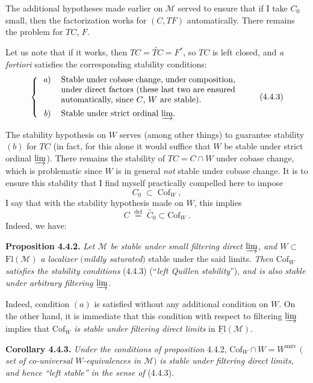 \documentclass[11pt]{article}
\newcommand{\printedpage}[1]{\marginpar{\footnotesize p.~#1}}
\newcommand{\msp}[1]{\marginpar{\footnotesize [#1]}}
\newcommand{\Fl}{\mathrm{Fl}}
\newcommand{\Cof}{\mathrm{Cof}}
\newcommand{\deq}{\overset{\text{def}}{=}}
\newcommand{\univ}{\mathrm{univ}}
\begin{document}
\msp{page 39}
The additional hypotheses made earlier on $\mathcal{M}$ served to ensure that if I take $C_0$ small, then the factorization works for $(C,TF)$ automatically. There remains the problem for $TC$, $F$.

Let us note that if it works, then $TC=\widetilde{TC}=F^*$, so $TC$ is left closed, and \textit{a fortiori} satisfies the corresponding stability conditions:
\[
\left\{
\begin{tabular}{rp{0.6\textwidth}}
\textit{a}) & Stable under cobase change, under composition, under direct factors (these last two are ensured automatically, since $C$, $W$ are stable).\\[1ex]
\textit{b}) & Stable under strict ordinal $\varinjlim$.
\end{tabular}
\right.
\tag*{(4.4.3)}
\]

The stability hypothesis on $W$ serves (among other things) to guarantee stability $(b)$ for $TC$ (in fact, for this alone it would suffice that $W$ be stable under strict ordinal $\varinjlim$). There remains the stability of $TC=C{\cap}W$ under cobase change, which is problematic since $W$ is in general \textit{not} stable under cobase change. It is to ensure this stability that I find myself practically compelled here to impose
\[
C_0\;\subset\;\Cof_W\ , \tag*{(4.4.4)}
\]
I say that with the stability hypothesis made on $W$, this implies
\[
C\;\deq\;\widetilde{C_0}\subset\Cof_W\ . \tag*{(4.4.5)}
\]
\printedpage{27}
\msp{page 40}
Indeed, we have:

\textbf{Proposition 4.4.2.} \textit{Let $\mathcal{M}$ be stable under small filtering direct $\varinjlim$, and $W\subset$} $\Fl(\mathcal{M})$ \textit{a localizer $($mildly saturated$)$} stable under the said limits. \textit{Then} $\Cof_W$ \textit{satisfies the stability conditions} (4.4.3) (``\textit{left Quillen stability}''), \textit{and is also stable under arbitrary filtering $\varinjlim$.}

Indeed, condition $(a)$ is satisfied without any additional condition on $W$. On the other hand, it is immediate that this condition with respect to filtering $\varinjlim$ implies that $\Cof_W$ \textit{is stable under filtering direct limits} in $\underline{\Fl}(\mathcal{M})$.

\textbf{Corollary 4.4.3.} \textit{Under the conditions of proposition} 4.4.2, $\Cof_W\cap W=W^{\univ}$ $($\textit{set of co-universal $W$-equivalences in $\mathcal{M}$}$)$ \textit{is stable under filtering direct limits, and hence ``left stable'' in the sense of} (4.4.3).
\end{document}
